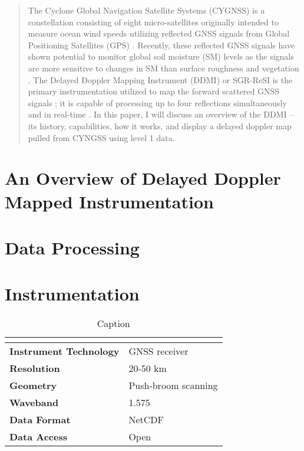 \documentclass[11pt]{article}
\begin{document}

\begin{abstract}
    \normalsize
    \vspace{1em}
    
    The Cyclone Global Navigation Satellite Systems (CYGNSS) is a constellation consisting of eight micro-satellites originally intended to measure ocean wind speeds utilizing reflected GNSS signals from Global Positioning Satellites (GPS) \cite{NASA}. Recently, these reflected GNSS signals have shown potential to monitor global soil moisture (SM) levels as the signals are more sensitive to changes in SM than surface roughness and vegetation \cite{Global_SM}. The Delayed Doppler Mapping Instrument (DDMI) or SGR-ReSI is the primary instrumentation utilized to map the forward scattered GNSS signals \cite{DDMI_Overview}; it is capable of processing up to four reflections simultaneously and in real-time \cite{DDMI_Overview, DDMI_Summary}. In this paper, I will discuss an overview of the DDMI -- its history, capabilities, how it works, and display a delayed doppler map pulled from CYNGSS using level 1 data. 

\end{abstract}

\section{An Overview of Delayed Doppler Mapped Instrumentation}


\section{Data Processing}


\clearpage
\appendix
\renewcommand{\theequation}{\thesection.\arabic{equation}}
\section{Instrumentation}

\setlength{\tabcolsep}{20pt}
\renewcommand{\arraystretch}{1.25}

\begin{table}[H]
    \centering
    \begin{tabular}{>{\bfseries}p{6cm} p{6cm}}
        \multicolumn{2}{c}{Delay Doppler Mapping Instrument (DDMI)} \\
        \hline
        Instrument Technology & GNSS receiver \\ 
        Resolution & 20-50 km \\
        Geometry & Push-broom scanning \\
        Waveband & 1.575 \\
        Data Format & NetCDF \\
        Data Access & Open \\
        \hline
    \end{tabular}
    \caption{Caption \cite{DDMI_Summary}}
    \label{tab:DDMI_Summary}
\end{table}

\clearpage
\printbibliography
\end{document}
